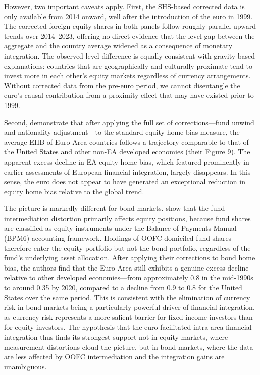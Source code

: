 \documentclass{article}
\begin{document}
However, two important caveats apply. First, the SHS-based corrected 
data is only available from 2014 onward, well after the introduction 
of the euro in 1999. The corrected foreign equity shares in both panels 
follow roughly parallel upward trends over 2014--2023, offering no 
direct evidence that the level gap between the aggregate and the 
country average widened as a consequence of monetary integration. The 
observed level difference is equally consistent with gravity-based 
explanations: countries that are geographically and culturally 
proximate tend to invest more in each other's equity markets regardless 
of currency arrangements. Without corrected data from the pre-euro 
period, we cannot disentangle the euro's causal contribution from a 
proximity effect that may have existed prior to 1999.

Second, \cite{beck2024} demonstrate that after applying the full set 
of corrections---fund unwind and nationality adjustment---to the 
standard equity home bias measure, the average EHB of Euro Area 
countries follows a trajectory comparable to that of the United States 
and other non-EA developed economies (their Figure 9). The apparent 
excess decline in EA equity home bias, which featured prominently in 
earlier assessments of European financial integration, largely 
disappears. In this sense, the euro does not appear to have generated 
an exceptional reduction in equity home bias relative to the global 
trend.

The picture is markedly different for bond markets. \cite{beck2024} 
show that the fund intermediation distortion primarily affects equity 
positions, because fund shares are classified as equity instruments 
under the Balance of Payments Manual (BPM6) accounting framework. 
Holdings of OOFC-domiciled fund shares therefore enter the equity 
portfolio but not the bond portfolio, regardless of the fund's 
underlying asset allocation. After applying their corrections to bond 
home bias, the authors find that the Euro Area still exhibits a 
genuine excess decline relative to other developed economies---from 
approximately 0.8 in the mid-1990s to around 0.35 by 2020, compared 
to a decline from 0.9 to 0.8 for the United States over the same 
period. This is consistent with the elimination of currency risk in 
bond markets being a particularly powerful driver of financial 
integration, as currency risk represents a more salient barrier for 
fixed-income investors than for equity investors. The hypothesis that 
the euro facilitated intra-area financial integration thus finds its 
strongest support not in equity markets, where measurement distortions 
cloud the picture, but in bond markets, where the data are less 
affected by OOFC intermediation and the integration gains are 
unambiguous.
\end{document}
